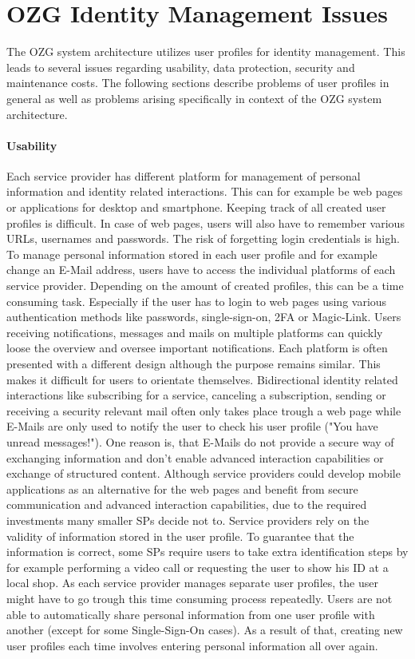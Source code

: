\section{OZG Identity Management Issues}

The OZG system architecture utilizes user profiles for identity management. This leads to several issues regarding usability, data protection, security and maintenance costs. The following sections describe problems of user profiles in general as well as problems arising specifically in context of the OZG system architecture.

\paragraph{Usability}
Each service provider has different platform for management of personal information and identity related interactions. This can for example be web pages or applications for desktop and smartphone. Keeping track of all created user profiles is difficult. In case of web pages, users will also have to remember various URLs, usernames and passwords. The risk of forgetting login credentials is high. To manage personal information stored in each user profile and for example change an E-Mail address, users have to access the individual platforms of each service provider. Depending on the amount of created profiles, this can be a time consuming task. Especially if the user has to login to web pages using various authentication methods like passwords, single-sign-on, 2FA or Magic-Link. Users receiving notifications, messages and mails on multiple platforms can quickly loose the overview and oversee important notifications. Each platform is often presented with a different design although the purpose remains similar. This makes it difficult for users to orientate themselves. Bidirectional identity related interactions like subscribing for a service, canceling a subscription, sending or receiving a security relevant mail often only takes place trough a web page while E-Mails are only used to notify the user to check his user profile ("You have unread messages!"). One reason is, that E-Mails do not provide a secure way of exchanging information and don't enable advanced interaction capabilities or exchange of structured content. Although service providers could develop mobile applications as an alternative for the web pages and benefit from secure communication and advanced interaction capabilities, due to the required investments many smaller SPs decide not to. Service providers rely on the validity of information stored in the user profile. To guarantee that the information is correct, some SPs require users to take extra identification steps by for example performing a video call or requesting the user to show his ID at a local shop. As each service provider manages separate user profiles, the user might have to go trough this time consuming process repeatedly. Users are not able to automatically share personal information from one user profile with another (except for some Single-Sign-On cases). As a result of that, creating new user profiles each time involves entering personal information all over again. 


